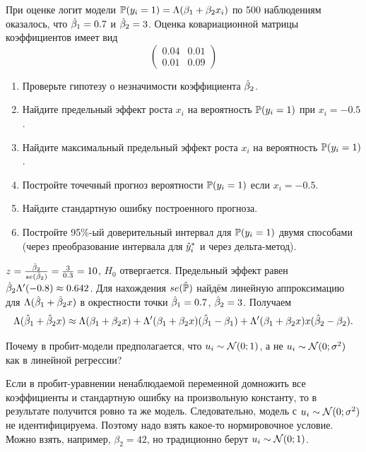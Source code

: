 \begin{problem}
При оценке логит модели
\(
\P(y_i=1)=\Lambda(\beta_1+\beta_2 x_i)
\)
по 500 наблюдениям оказалось, что $\hb_1=0.7$ и $\hb_2=3$. 
Оценка ковариационной матрицы коэффициентов имеет вид
\[
\begin{pmatrix}
  0.04 & 0.01 \\
  0.01 & 0.09
\end{pmatrix}
\]

\begin{enumerate}
\item Проверьте гипотезу о незначимости коэффициента $\hb_2$.
\item Найдите предельный эффект роста $x_i$ на вероятность $\P(y_i=1)$ при $x_i=-0.5$.
\item Найдите максимальный предельный эффект роста $x_i$ на вероятность $\P(y_i=1)$.
\item Постройте точечный прогноз вероятности $\P(y_i=1)$ если $x_i = -0.5$.
\item Найдите стандартную ошибку построенного прогноза.
\item Постройте 95\%-ый доверительный интервал для $\P(y_i=1)$ двумя способами (через преобразование интервала для $\hy_i^*$ и через дельта-метод).
\end{enumerate}
\begin{sol}
$z = \frac{\hb_2}{se(\hb_2)}=\frac{3}{0.3}=10$, $H_0$ отвергается.
Предельный эффект равен $\hb_2 \Lambda'(-0.8)\approx 0.642$.
Для нахождения $se(\hat\P)$ найдём линейную аппроксимацию для $\Lambda(\hb_1 + \hb_2 x)$ в окрестности точки $\hb_1=0.7$, $\hb_2=3$. Получаем
\[
\Lambda(\hb_1 + \hb_2 x) \approx \Lambda(\beta_1 + \beta_2 x) + \Lambda'(\beta_1 + \beta_2 x) (\hb_1 - \beta_1) + \Lambda'(\beta_1 + \beta_2 x)x(\hb_2 - \beta_2).
\]
\end{sol}
\end{problem}


\begin{problem}
Почему в пробит-модели предполагается, что $u_i \sim \cN(0;1)$, а не $u_i \sim \cN(0;\sigma^2)$ как в линейной регрессии?
\begin{sol}
Если в пробит-уравнении ненаблюдаемой переменной домножить все коэффициенты и стандартную ошибку на произвольную константу, 
то в результате получится ровно та же модель. 
Следовательно, модель с $u_i \sim \cN(0;\sigma^2)$ не идентифицируема. 
Поэтому надо взять какое-то нормировочное условие. 
Можно взять, например, $\beta_2 = 42$, но традиционно берут $u_i \sim \cN(0;1)$.
\end{sol}
\end{problem}



